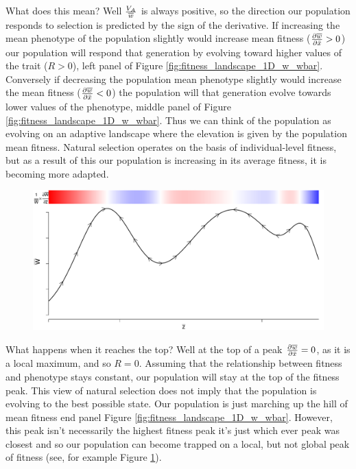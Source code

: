 What does this mean? Well $\frac{V_A}{\overline{w}}$ is always positive,
so the direction our population responds to selection is
predicted by the sign of the derivative. If increasing the mean
phenotype of the population slightly would 
increase mean fitness ($ \frac{\partial \overline{w}}{\partial \bar{x}}
>0$) our population will respond that generation by evolving toward
higher values of the trait ($R>0$), left panel of Figure \ref{fig:fitness_landscape_1D_w_wbar}. Conversely if decreasing the
population mean phenotype slightly would increase the mean fitness ($ \frac{\partial \overline{w}}{\partial \bar{x}}
<0$) the population will that generation evolve towards lower values
of the phenotype, middle panel of Figure \ref{fig:fitness_landscape_1D_w_wbar}.  Thus we can think of the population as evolving on
an adaptive landscape where the elevation is given by the population mean
fitness. Natural selection operates on the basis of individual-level
fitness, but as a result of this our population is increasing in its
average fitness, it is becoming more adapted.
 \begin{figure}
 \begin{center}
 \includegraphics[width= 0.8 \textwidth]{figures/Response_to_sel/fitness_landscape_1D.pdf}
 \end{center}
 \caption{} \label{fig:fitness_landscape_1D}  
\end{figure}

What happens when it
reaches the top? Well at the top of a peak $ \frac{\partial
  \overline{w}}{\partial \bar{x}}=0$, as it is a local maximum, and so
$R=0$. Assuming that the relationship between fitness and phenotype
stays constant, our population will stay at the top of the fitness
peak. This view of natural selection does not imply that the population
is evolving to the best possible state. Our population is just
marching up the hill of mean fitness end panel Figure
\ref{fig:fitness_landscape_1D_w_wbar}. However, this peak isn't necessarily the highest fitness peak it's just
which ever peak was closest and so our population can become trapped
on a local, but not global peak of fitness (see, for example Figure \ref{fig:fitness_landscape_1D}).

